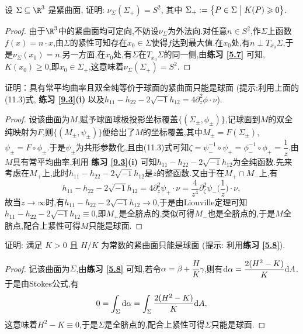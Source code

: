	\begin{excise}
		设 $\Sigma \subseteq \R^3$ 是紧曲面, 证明: $\nu_{\Sigma}(\Sigma_{+})=S^{2}$, 其中 $\Sigma_{+}:= \left\{P \in \Sigma \bigm| K(P) \geqslant 0\right\}$.
	\end{excise}
	\begin{proof}
		由于$\R^{3}$中的紧曲面均可定向,不妨设$\nu_{\Sigma}$为外法向.对任意$n\in S^{2}$,作$\Sigma$上函数$f(x)=n\cdot x$,由$\Sigma$的紧性可知存在$x_{0}\in\Sigma$使得$f$达到最大值.在$x_{0}$处,有$n\perp T_{x_{0}}\Sigma$,于是$\nu_{\Sigma}(x_{0})=n$.另一方面,在$x_{0}$处,有$\Sigma$在$T_{x_{0}}\Sigma$的同一侧,由\textbf{练习 \ref{5.7}} 可知,$K(x_{0})\geqslant 0$,即$x_{0}\in \Sigma_{+}$,这意味着$\nu_{\Sigma}(\Sigma_{+})=S^{2}$.
	\end{proof}
	\begin{excise}
		证明：具有常平均曲率且双全纯等价于球面的紧曲面只能是球面 (提示:利用上面的(11.3)式, \textbf{练习 \ref{9.3}(i)} 以及$h_{11}-h_{22}-2 \sqrt{-1} h_{12}=4 \partial_z^2 \phi \cdot \nu$).
	\end{excise}
	\begin{proof}
		设该曲面为$M$,赋予球面球极投影坐标覆盖$\{(\Sigma_{\pm},\phi_{\pm})\}$,记球面到$M$的双全纯映射为$F$,则$\{(M_{\pm},\psi_{\pm})\}$便给出了$M$的坐标覆盖,其中$M_{\pm}=F(\Sigma_{\pm})$, $\psi_{\pm}=F\circ\phi_{\pm}$.于是$\psi_{\pm}$为共形参数化,且由(11.3)式可知$\zeta=\psi_{-}^{-1}\circ\psi_{+}=\phi_{-}^{-1}\circ\phi_{+}=\dfrac{1}{z}$.由$M$具有常平均曲率,利用 \textbf{练习 \ref{9.3}(i)} 可知$h_{11}-h_{22}-2 \sqrt{-1} h_{12}$为全纯函数.先来考虑在$M_{+}$上,此时$h_{11}-h_{22}-2 \sqrt{-1} h_{12}$是$z$的整函数.又由于在$M_{+}\cap M_{-}$上,有
		$$
		h_{11}-h_{22}-2 \sqrt{-1} h_{12}=4 \partial_{z}^2 \psi_{+} \cdot \nu=\frac{4}{z^{4}} \partial_{\zeta}^2 \psi_{-}\Big(\frac{1}{z}\Big) \cdot \nu,
		$$
		故当$z\to\infty$时,有$h_{11}-h_{22}-2 \sqrt{-1} h_{12}\to 0$,于是由Liouville定理可知$h_{11}-h_{22}-2 \sqrt{-1} h_{12}\equiv 0$,即$M_{+}$是全脐点的,类似可得$M_{-}$也是全脐点的,于是$M$全脐点,配合上紧性可得$M$只能是球面.
	\end{proof}
	\begin{excise}
		证明: 满足 $K>0$ 且 $H / K$ 为常数的紧曲面只能是球面 (提示: 利用\textbf{练习 \ref{5.8}}).
	\end{excise}
	\begin{proof}
		记该曲面为$\Sigma$,由\textbf{练习 \ref{5.8}} 可知,若令$\alpha=\beta+\dfrac{H}{K}\gamma$,则有$\mathrm{d}\alpha=\dfrac{2(H^{2}-K)}{K}\mathrm{d} A$.于是由Stokes公式,有
		$$
		0=\int_{\Sigma}\mathrm{d}\alpha=\int_{\Sigma}\frac{2(H^{2}-K)}{K}\mathrm{d} A,
		$$
		这意味着$H^{2}-K\equiv 0$,于是$\Sigma$是全脐点的,配合上紧性可得$\Sigma$只能是球面.
	\end{proof}
